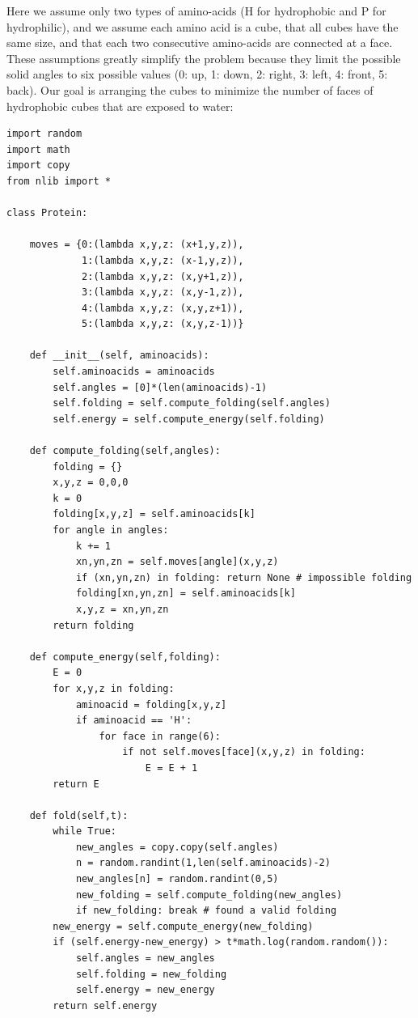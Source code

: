 \documentclass[justified,sixbynine]{tufte-book}
\def\ft{\small\tt}
\theoremstyle{plain}%
\theoremstyle{definition}
\theoremstyle{remark}
\begin{document}
\begin{fullwidth}
Here we assume only two types of amino-acids (H for hydrophobic and P for hydrophilic), and we assume each amino acid is a cube, that all cubes have the same size, and that each two consecutive amino-acids are connected at a face. These assumptions greatly simplify the problem because they limit the possible solid angles to six possible values (0: up, 1: down, 2: right, 3: left, 4: front, 5: back). Our goal is arranging the cubes to minimize the number of faces of hydrophobic cubes that are exposed to water:


\begin{lstlisting}[caption={in file: {\ft folding.py}}]
import random
import math
import copy
from nlib import *

class Protein:

    moves = {0:(lambda x,y,z: (x+1,y,z)),
             1:(lambda x,y,z: (x-1,y,z)),
             2:(lambda x,y,z: (x,y+1,z)),
             3:(lambda x,y,z: (x,y-1,z)),
             4:(lambda x,y,z: (x,y,z+1)),
             5:(lambda x,y,z: (x,y,z-1))}

    def __init__(self, aminoacids):
        self.aminoacids = aminoacids
        self.angles = [0]*(len(aminoacids)-1)
        self.folding = self.compute_folding(self.angles)
        self.energy = self.compute_energy(self.folding)

    def compute_folding(self,angles):
        folding = {}
        x,y,z = 0,0,0
        k = 0
        folding[x,y,z] = self.aminoacids[k]
        for angle in angles:
            k += 1
            xn,yn,zn = self.moves[angle](x,y,z)
            if (xn,yn,zn) in folding: return None # impossible folding
            folding[xn,yn,zn] = self.aminoacids[k]
            x,y,z = xn,yn,zn
        return folding

    def compute_energy(self,folding):
        E = 0
        for x,y,z in folding:
            aminoacid = folding[x,y,z]
            if aminoacid == 'H':
                for face in range(6):
                    if not self.moves[face](x,y,z) in folding:
                        E = E + 1
        return E

    def fold(self,t):
        while True:
            new_angles = copy.copy(self.angles)
            n = random.randint(1,len(self.aminoacids)-2)
            new_angles[n] = random.randint(0,5)
            new_folding = self.compute_folding(new_angles)
            if new_folding: break # found a valid folding
        new_energy = self.compute_energy(new_folding)
        if (self.energy-new_energy) > t*math.log(random.random()):
            self.angles = new_angles
            self.folding = new_folding
            self.energy = new_energy
        return self.energy


\end{lstlisting}
\end{fullwidth}
\end{document}
